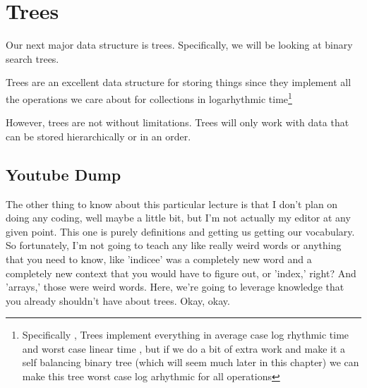 \chapter{Trees}



Our next major data structure is trees.  Specifically, we will be looking at binary search trees.

Trees are an excellent data structure for storing things since they implement all the operations we care about for collections in logarhythmic time\footnote{Specifically , Trees implement everything in average case log rhythmic time and worst case linear time , but if we do a bit of extra work and make it a self balancing binary tree (which will seem much later in this chapter) we can make this tree worst case log arhythmic for all operations}


However, trees are not without limitations.  Trees will only work with data that can be stored hierarchically or in an order.


\section{Youtube Dump}

The other thing to know about this particular lecture is that I don't plan on doing any coding, well maybe a little bit, but I'm not actually my editor at any given point. This one is purely definitions and getting us getting our vocabulary. So fortunately, I'm not going to teach any like really weird words or anything that you need to know, like 'indicee' was a completely new word and a completely new context that you would have to figure out, or 'index,' right? And 'arrays,' those were weird words. Here, we're going to leverage knowledge that you already shouldn't have about trees. Okay, okay.

